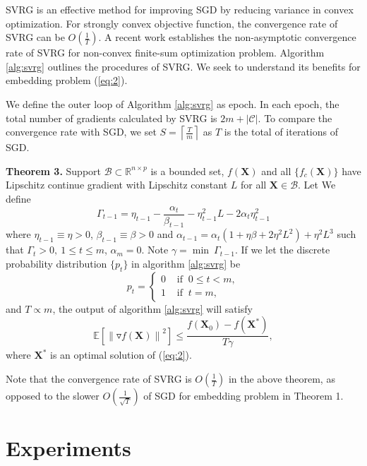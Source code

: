 \documentclass[letterpaper]{article}
\begin{document}
		SVRG \cite{rie2013accelerating} is an effective method for improving SGD by reducing variance in convex optimization. For strongly convex objective function, the convergence rate of SVRG can be $O(\frac{1}{T})$. A recent work \cite{reddic2016nonconvex} establishes the non-asymptotic convergence rate of SVRG for non-convex finite-sum optimization problem. Algorithm \ref{alg:svrg} outlines the procedures of SVRG. We seek to understand its benefits for embedding problem (\ref{eq:2}).

		We define the outer loop of Algorithm \ref{alg:svrg} as epoch. In each epoch, the total number of gradients calculated by SVRG is $2m+|\mathcal{C}|$. To compare the convergence rate with SGD, we set $S = \left \lceil \frac{T}{m} \right \rceil$ as $T$ is the total of iterations of SGD.

		\textbf{Theorem 3.} Support $\mathcal{B}\subset\mathbb{R}^{n\times p}$ is a bounded set, $f(\mathbf{X})$ and all $\{f_c(\mathbf{X})\}$ have Lipschitz continue gradient with Lipschitz constant $L$ for all $\mathbf{X}\in\mathcal{B}$. Let We define
		$$
		\Gamma_{t-1} = \eta_{t-1}-\frac{\alpha_{t}}{\beta_{t-1}}-\eta^2_{t-1}L-2\alpha_{t}\eta^2_{t-1}
		$$
		where $\eta_{t-1}\equiv\eta>0$, $\beta_{t-1}\equiv\beta>0$ and $\alpha_{t-1}=\alpha_{t}(1+\eta\beta+2\eta^2L^2)+\eta^2L^3$ such that $\Gamma_t>0,\  1\leq t\leq m$, $\alpha_m=0$. Note $\gamma=\min\ \Gamma_{t-1}$. If we let the discrete probability distribution  $\{p_t\}$ in algorithm \ref{alg:svrg} be
		$$
		p_t=
		\begin{cases}
			0 & \text{ if }\ 0\leq t < m, \\
			1 & \text{ if }\ t = m,
		\end{cases}
		$$
		and $T\propto m$, the output of algorithm \ref{alg:svrg} will satisfy
		$$
			\mathbb{E}\left[\left\|\triangledown f(\mathbf{X})\right\|^2\right]\leq \frac{f(\mathbf{X}_0)-f(\mathbf{X}^*)}{T\gamma},
		$$
		where $\mathbf{X}^*$ is an optimal solution of (\ref{eq:2}).

		Note that the convergence rate of SVRG is $O(\frac{1}{T})$ in the above theorem, as opposed to the slower $O(\frac{1}{\sqrt{T}})$ of SGD for embedding problem in Theorem 1.

		\section{Experiments}
\end{document}

